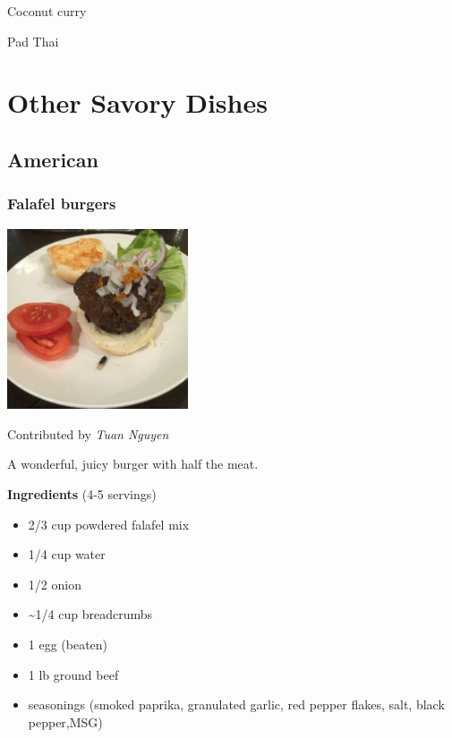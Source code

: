 \documentclass[
]{book}
\providecommand{\tightlist}{%
  \setlength{\itemsep}{0pt}\setlength{\parskip}{0pt}}
\begin{document}
Coconut curry

Pad Thai

\hypertarget{other-savory-dishes}{%
\chapter*{Other Savory Dishes}\label{other-savory-dishes}}

\hypertarget{american}{%
\section*{American}\label{american}}

\hypertarget{burger}{%
\subsection*{Falafel burgers}\label{burger}}

\includegraphics[width=0.4\textwidth,height=\textheight]{falafel_burger_small.jpg}

Contributed by \emph{Tuan Nguyen}

A wonderful, juicy burger with half the meat.

\begin{blackbox}

\textbf{Ingredients} (4-5 servings)

\begin{itemize}
\tightlist
\item
  2/3 cup powdered falafel mix
\item
  1/4 cup water
\item
  1/2 onion
\item
  \textasciitilde1/4 cup breadcrumbs
\item
  1 egg (beaten)
\item
  1 lb ground beef
\item
  seasonings (smoked paprika, granulated garlic, red pepper flakes, salt, black pepper,MSG)
\end{itemize}

\end{blackbox}
\end{document}

